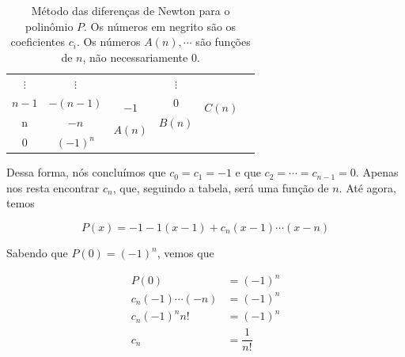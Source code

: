 \documentclass{article}
\begin{document}
\begin{enumerate}
\begin{table}[!h]
\begin{tabular}{c|c|c|c|c|l}
                    \\
                    $\vdots$ &
                    $\vdots$ &
                    &
                    $\vdots$ &
                    &
                    \\
                    \multirow{2}{*}{$n-1$} &
                    \multirow{2}{*}{$-(n-1)$} &
                    &
                    \multirow{2}{*}{0} &
                    &
                    \\
                    &
                    &
                    \multirow{2}{*}{$-1$} &
                    &
                    \multirow{2}{*}{$C(n)$} &
                    \\
                    \multirow{2}{*}{n} &
                    \multirow{2}{*}{$-n$} &
                    &
                    \multirow{2}{*}{$B(n)$} &
                    &
                    \\
                    &
                    &
                    \multirow{2}{*}{$A(n)$} &
                    &
                    &
                    \\
                    \multirow{2}{*}{0} &
                    \multirow{2}{*}{$(-1)^n$} &
                    &
                    &
                    &
                    \\
                    &
                    &
                    &
                    &
                    &
                
                \end{tabular}
                \caption{Método das diferenças de Newton para o polinômio $P$.
                Os números em negrito são os coeficientes $c_i$.
                Os números $A(n), \cdots$ são funções de $n$, não necessariamente $0$.}
                \label{tab:diff}
            \end{table}

            Dessa forma, nós concluímos que $c_0 = c_1 = -1$ e que
            $c_2 = \cdots = c_{n-1} = 0$.
            Apenas nos resta encontrar $c_n$, que, seguindo a tabela,
            será uma função de $n$. Até agora, temos
            
            $$P(x) = -1 -1(x-1) + c_n(x-1)\cdots(x-n)$$

            Sabendo que $P(0) = (-1)^n$, vemos que

            \begin{align*}
                P(0) &= (-1)^n \\
                c_n(-1)\cdots(-n) &= (-1)^n \\
                c_n(-1)^n n! &= (-1)^n \\
                c_n &= \dfrac{1}{n!} \\
            \end{align*}


\end{enumerate}
\end{document}

